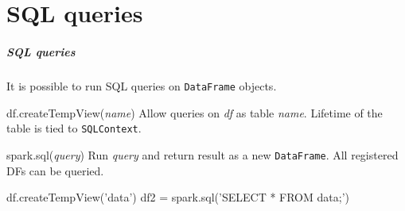 \documentclass[english,serif,mathserif]{beamer}
\begin{document}
\part{SQL queries}
\begin{frame}[fragile]
  \frametitle{SQL queries}
  It is possible to run SQL queries on \texttt{DataFrame} objects.

  \+
  \begin{describe}{df.createTempView(\emph{name})}
    Allow queries on {\ttfamily\em df} as table {\ttfamily\em name}.  Lifetime of the
    table is tied to \texttt{SQLContext}.
  \end{describe}

  \+
  \begin{describe}{spark.sql(\emph{query})}
    Run {\ttfamily\em query} and return result as a new \texttt{DataFrame}.
    All registered DFs can be queried.
    \begin{python}
df.createTempView('data')
df2 = spark.sql('SELECT * FROM data;')
    \end{python}
  \end{describe}
\end{frame}
\end{document}
